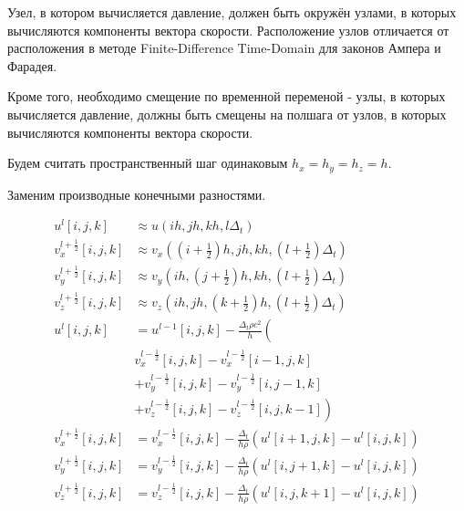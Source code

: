 Узел, в котором вычисляется давление,
должен быть окружён узлами, в которых вычисляются компоненты вектора скорости.
Расположение узлов отличается
от расположения
в методе Finite-Difference Time-Domain для законов Ампера и Фарадея.

Кроме того, необходимо смещение по временной переменой
- узлы, в которых вычисляется давление, должны быть смещены на полшага
от узлов, в которых вычисляются компоненты вектора скорости.

Будем считать пространственный шаг одинаковым \( h_x = h_y = h_z = h \).

Заменим производные конечными разностями.

\begin{align*}
    u^l \left[ i, j, k \right]
    &\approx u \left( ih, jh, kh, l \Delta_t \right)
    \\
    v_x^{l + \frac{1}{2}} \left[ i, j, k \right]
    & \approx
    v_x
    \left(
    \left( i + \frac{1}{2} \right) h,
    jh,
    kh,
    \left( l + \frac{1}{2} \right) \Delta_t
    \right)
    \\
    v_y^{l + \frac{1}{2}} \left[ i, j, k \right]
    & \approx
    v_y
    \left(
    ih,
    \left( j + \frac{1}{2} \right) h,
    kh,
    \left( l + \frac{1}{2} \right) \Delta_t
    \right)
    \\
    v_z^{l + \frac{1}{2}} \left[ i, j, k \right]
    & \approx
    v_z
    \left(
    ih,
    jh,
    \left( k + \frac{1}{2} \right) h,
    \left( l + \frac{1}{2} \right) \Delta_t
    \right)
    \\
    u^l \left[ i, j, k \right]
    &= 
    u^{l-1} \left[ i, j, k \right]
    -
    \frac{\Delta_t \rho c^2}{h}
    \left( \right.
    \\
    &v_x^{l - \frac{1}{2}} \left[ i, j, k \right]
    - v_x^{l - \frac{1}{2}} \left[ i - 1, j, k \right]
    \\
    &+ v_y^{l - \frac{1}{2}} \left[ i, j, k \right]
    - v_y^{l - \frac{1}{2}} \left[ i, j - 1, k \right]
    \\
    &+ v_z^{l - \frac{1}{2}} \left[ i, j, k \right]
    - v_z^{l - \frac{1}{2}} \left[ i, j, k - 1 \right]
    \left. \right)
    \\
    v_x^{l + \frac{1}{2}} \left[ i, j, k \right]
    &=
    v_x^{l - \frac{1}{2}} \left[ i, j, k \right]
    -
    \frac{\Delta_t}{h \rho}
    \left( u^l \left[ i + 1, j, k \right] - u^l \left[ i, j, k \right] \right)
    \\
    v_y^{l + \frac{1}{2}} \left[ i, j, k \right]
    &=
    v_y^{l - \frac{1}{2}} \left[ i, j, k \right]
    -
    \frac{\Delta_t}{h \rho}
    \left( u^l \left[ i, j + 1, k \right] - u^l \left[ i, j, k \right] \right)
    \\
    v_z^{l + \frac{1}{2}} \left[ i, j, k \right]
    &=
    v_z^{l - \frac{1}{2}} \left[ i, j, k \right]
    -
    \frac{\Delta_t}{h \rho}
    \left( u^l \left[ i, j, k + 1 \right] - u^l \left[ i, j, k \right] \right)
    \\
\end{align*}

